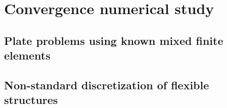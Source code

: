 \chapter{Convergence numerical study}

\section{Plate problems using known mixed finite elements}

\section{Non-standard discretization of flexible structures}